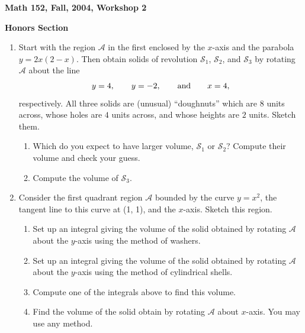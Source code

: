\documentclass[12pt]{article}
\begin{document}
\begin{center}

{\large \bf Math 152, Fall, 2004, Workshop 2\par}
\vspace{.5cm}
{{\bf Honors Section} 
\par}
\end{center}


\begin{enumerate}

\item Start with the region $\mathcal{A}$ in the first enclosed by 
the $x$-axis and the parabola $y=2x(2-x)$. Then obtain 
solids of revolution $\mathcal{S}_{1}$, $\mathcal{S}_{2}$,
and $\mathcal{S}_{3}$ by rotating $\mathcal{A}$ about the 
line 
$$y=4, \quad\quad y=-2,\quad\quad\mbox{\rm and}\quad\quad x=4,$$
respectively. All three solids are (unusual) ``doughnuts'' which
are $8$ units across, whose holes are $4$ units across, and whose 
heights are $2$ units. Sketch them.

\begin{enumerate}

\item Which do you expect to have larger volume, 
$\mathcal{S}_{1}$ or $\mathcal{S}_{2}$? Compute
their volume and check your guess.

\item Compute the volume of $\mathcal{S}_{3}$.

\end{enumerate}



\item Consider the first quadrant region $\mathcal{A}$
bounded by the curve $y =
x^{2}$, the tangent line to this curve at 
(1, 1), and the $x$-axis. 
Sketch this region.

\begin{enumerate}



\item Set up an integral giving the volume 
of the solid obtained by rotating $\mathcal{A}$ about the 
$y$-axis using the method of washers.

\item Set up an integral giving the volume 
of the solid obtained by rotating $\mathcal{A}$ about the 
$y$-axis using the method of cylindrical shells.

\item Compute one of the integrals above to find this volume.

\item Find the volume of the solid obtain by rotating $\mathcal{A}$
about $x$-axis. You may use any method.

\end{enumerate}

\end{enumerate}
\end{document}

